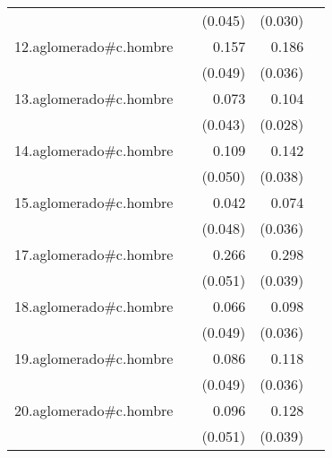 {\begin{longtable}{l*{4}{D{.}{.}{-1}}}
            &                     &     (0.045)         &     (0.030)         &                     \\
\addlinespace
12.aglomerado#c.hombre&                     &       0.157\sym{**} &       0.186\sym{***}&                     \\
            &                     &     (0.049)         &     (0.036)         &                     \\
\addlinespace
13.aglomerado#c.hombre&                     &       0.073         &       0.104\sym{***}&                     \\
            &                     &     (0.043)         &     (0.028)         &                     \\
\addlinespace
14.aglomerado#c.hombre&                     &       0.109\sym{*}  &       0.142\sym{***}&                     \\
            &                     &     (0.050)         &     (0.038)         &                     \\
\addlinespace
15.aglomerado#c.hombre&                     &       0.042         &       0.074\sym{*}  &                     \\
            &                     &     (0.048)         &     (0.036)         &                     \\
\addlinespace
17.aglomerado#c.hombre&                     &       0.266\sym{***}&       0.298\sym{***}&                     \\
            &                     &     (0.051)         &     (0.039)         &                     \\
\addlinespace
18.aglomerado#c.hombre&                     &       0.066         &       0.098\sym{**} &                     \\
            &                     &     (0.049)         &     (0.036)         &                     \\
\addlinespace
19.aglomerado#c.hombre&                     &       0.086         &       0.118\sym{***}&                     \\
            &                     &     (0.049)         &     (0.036)         &                     \\
\addlinespace
20.aglomerado#c.hombre&                     &       0.096         &       0.128\sym{**} &                     \\
            &                     &     (0.051)         &     (0.039)         &                     \\

\end{longtable}}
